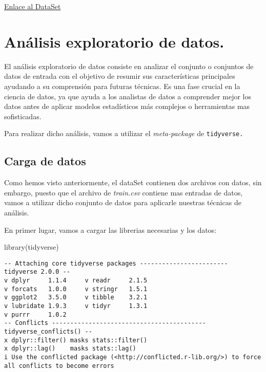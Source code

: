 \documentclass[
  letterpaper,
  DIV=11,
  numbers=noendperiod]{scrreprt}
\newenvironment{Shaded}{\begin{snugshade}}{\end{snugshade}}
\newcommand{\FunctionTok}[1]{\textcolor[rgb]{0.28,0.35,0.67}{#1}}
\newcommand{\NormalTok}[1]{\textcolor[rgb]{0.00,0.23,0.31}{#1}}
\begin{document}
\href{https://www.kaggle.com/datasets/free4ever1/instagram-fake-spammer-genuine-accounts}{Enlace
al DataSet}


\chapter{Análisis exploratorio de
datos.}\label{anuxe1lisis-exploratorio-de-datos.}

El análisis exploratorio de datos consiste en analizar el conjunto o
conjuntos de datos de entrada con el objetivo de resumir sus
características principales ayudando a su comprensión para futuras
técnicas. Es una fase crucial en la ciencia de datos, ya que ayuda a los
analistas de datos a comprender mejor los datos antes de aplicar modelos
estadísticos más complejos o herramientas mas sofisticadas.

Para realizar dicho análisis, vamos a utilizar el \emph{meta-package} de
\texttt{tidyverse.}

\section{Carga de datos}\label{carga-de-datos}

Como hemos visto anteriormente, el dataSet contienen dos archivos con
datos, sin embargo, puesto que el archivo de \emph{train.csv} contiene
mas entradas de datos, vamos a utilizar dicho conjunto de datos para
aplicarle nuestras técnicas de análisis.

En primer lugar, vamos a cargar las librerias necesarias y los datos:

\begin{Shaded}
\begin{Highlighting}[]
\FunctionTok{library}\NormalTok{(tidyverse) }
\end{Highlighting}
\end{Shaded}

\begin{verbatim}
-- Attaching core tidyverse packages ------------------------ tidyverse 2.0.0 --
v dplyr     1.1.4     v readr     2.1.5
v forcats   1.0.0     v stringr   1.5.1
v ggplot2   3.5.0     v tibble    3.2.1
v lubridate 1.9.3     v tidyr     1.3.1
v purrr     1.0.2     
-- Conflicts ------------------------------------------ tidyverse_conflicts() --
x dplyr::filter() masks stats::filter()
x dplyr::lag()    masks stats::lag()
i Use the conflicted package (<http://conflicted.r-lib.org/>) to force all conflicts to become errors
\end{verbatim}
\end{document}

